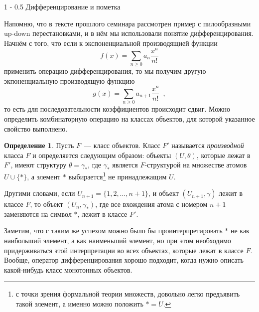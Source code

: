 \documentclass{article}
\makeatletter
\theoremstyle{definition}
\newtheorem*{definition}{Определение}
\renewcommand{\subsection}{\@startsection
{subsection}%
{1}%
{\z@}%
{-\baselineskip}%
{0.5\baselineskip}%
{\centering\large\scshape}} %
\makeatother
\begin{document}
\subsection{Дифференцирование и пометка}
 
Напомню, что в тексте прошлого семинара рассмотрен пример с пилообразными
up-down перестановками, и в нём мы использовали понятие дифференцирования.
Начнём с того, что если к экспоненциальной производящией функции
\[
    f(x) = \sum_{n \geq 0} a_n \dfrac{x^n}{n!}
\]
применить операцию дифференцирования, то мы получим другую экпоненциальную
производящую функцию
\[
    g(x) = \sum_{n \geq 0} a_{n+1} \dfrac{x^n}{n!} \enspace ,
\]
то есть для последовательности коэффициентов происходит сдвиг. Можно определить
комбинаторную операцию на классах объектов, для которой указанное свойство
выполнено.

\begin{definition}
    Пусть \( F \)~--- класс объектов. Класс \( F' \) называется
\textit{производной} класса \( F \) и определяется следующим образом: объекты
\( (U, \theta) \), которые лежат в \( F' \), имеют структуру
\(
    \theta = \gamma_{\ast}
\),
где \( \gamma_{\ast} \) является \( F \)-структурой на множестве атомов \( U
\cup \{\ast\} \), а элемент \( \ast \) выбирается\footnote{с точки зрения
формальной теории множеств, довольно легко предъявить такой элемент, а именно
можно положить \( \ast = U \).} не принадлежащим \( U \).

Другими словами, если
\( U_{n+1} = \{ 1, 2, \ldots, n+1 \} \), и объект \( (U_{n+1}, \gamma) \) лежит
в классе \( F \), то объект \( (U_n, \gamma_{\ast}) \), где все вхождения атома с
номером \( n+1 \) заменяются на символ \( \ast \), лежит в классе \( F' \).
\end{definition}

Заметим, что с таким же успехом можно было бы проинтерпретировать \( \ast \) не
как наибольший элемент, а как наименьший элемент, но при этом необходимо
придерживаться этой интерпретации во всех объектах, которые лежат в классе \( F
\). Вообще, оператор дифференцирования хорошо подходит, когда нужно описать
какой-нибудь класс монотонных объектов.
\end{document}
